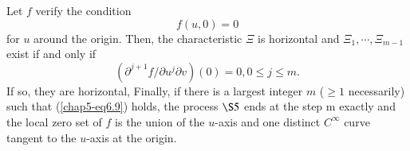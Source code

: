 \begin{corollary}\label{chap5-coro6.1}
Let $f$ verify the condition
\begin{equation*}
f(u, 0) = 0\tag{6.8}\label{chap5-eq6.8}
\end{equation*}
for $u$ around the origin. Then, the characteristic $\Xi$ is horizontal
and $\Xi_{1}, \cdots, \Xi_{m-1}$ exist if and only if
\begin{equation*}
(\partial^{j+1}f/\partial u^{j} \partial v)(0) = 0, 0 \leq j \leq m.\tag{6.9}\label{chap5-eq6.9}
\end{equation*}
If so, they are horizontal, Finally, if there is a largest integer $m$
($\geq 1$ necessarily) such that (\ref{chap5-eq6.9}) holds, the
process $\S 5$ ends at the step m exactly and the local zero set of $f$
is the union of the $u$-axis and one distinct $C^{\infty}$ curve tangent
to the $u$-axis at the origin.
\end{corollary}

